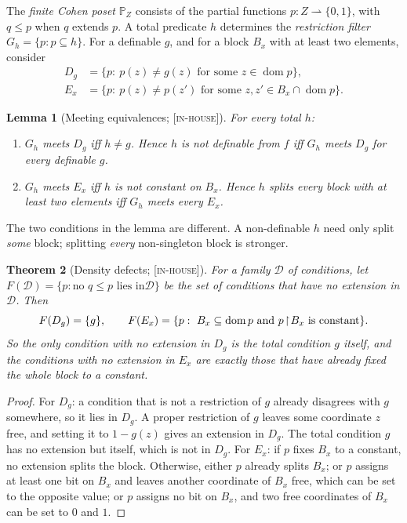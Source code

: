 \documentclass[11pt]{article}
\newcommand{\dom}{\operatorname{dom}}
\newcommand{\Cgen}{\mathbb{P}}                 \newcommand{\Fn}{\operatorname{Fn}}
\newcommand{\gradetag}[1]{\textnormal{\textsc{[#1]}}}
\newcommand{\inhouse}{\gradetag{in-house}}
\newtheorem{theorem}{Theorem}[section]
\newtheorem{lemma}[theorem]{Lemma}
\theoremstyle{definition}
\begin{document}
The \emph{finite Cohen poset} $\Cgen_Z$ consists of the partial functions $p\colon
Z\rightharpoonup\{0,1\}$, with $q\le p$ when $q$ extends $p$. A total predicate $h$ determines the
\emph{restriction filter} $G_h=\{p:p\subseteq h\}$. For a definable $g$, and for a block $B_x$ with
at least two elements, consider
\[
\begin{aligned}
  D_g&=\{p:\ p(z)\ne g(z)\text{ for some }z\in\dom p\},\\
  E_x&=\{p:\ p(z)\ne p(z')\text{ for some }z,z'\in B_x\cap\dom p\}.
\end{aligned}
\]

\begin{lemma}[Meeting equivalences; \inhouse]\label{lem:meeting}
For every total $h$:
\begin{enumerate}\itemsep0pt
\item $G_h$ meets $D_g$ iff $h\ne g$. Hence $h$ is not definable from $f$ iff $G_h$ meets $D_g$
for every definable $g$.
\item $G_h$ meets $E_x$ iff $h$ is not constant on $B_x$. Hence $h$ splits every block with at
least two elements iff $G_h$ meets every $E_x$.
\end{enumerate}
\end{lemma}

The two conditions in the lemma are different. A non-definable $h$ need only split \emph{some}
block; splitting \emph{every} non-singleton block is stronger.

\begin{theorem}[Density defects; \inhouse]\label{thm:densitydefect}
For a family $\mathcal D$ of conditions, let $F(\mathcal D)=\{p:\text{no }q\le p\text{ lies in
}\mathcal D\}$ be the set of conditions that have no extension in $\mathcal D$. Then
\[
  F(D_g)=\{g\},\qquad
  F(E_x)=\{p:\ B_x\subseteq\dom p\text{ and }p\restr B_x\text{ is constant}\}.
\]
So the only condition with no extension in $D_g$ is the total condition $g$ itself, and the
conditions with no extension in $E_x$ are exactly those that have already fixed the whole block to
a constant.
\end{theorem}

\begin{proof}
For $D_g$: a condition that is not a restriction of $g$ already disagrees with $g$ somewhere, so
it lies in $D_g$. A proper restriction of $g$ leaves some coordinate $z$ free, and setting it to
$1-g(z)$ gives an extension in $D_g$. The total condition $g$ has no extension but itself, which
is not in $D_g$. For $E_x$: if $p$ fixes $B_x$ to a constant, no extension splits the block.
Otherwise, either $p$ already splits $B_x$; or $p$ assigns at least one bit on $B_x$ and leaves
another coordinate of $B_x$ free, which can be set to the opposite value; or $p$ assigns no bit on
$B_x$, and two free coordinates of $B_x$ can be set to $0$ and $1$.
\end{proof}
\end{document}
